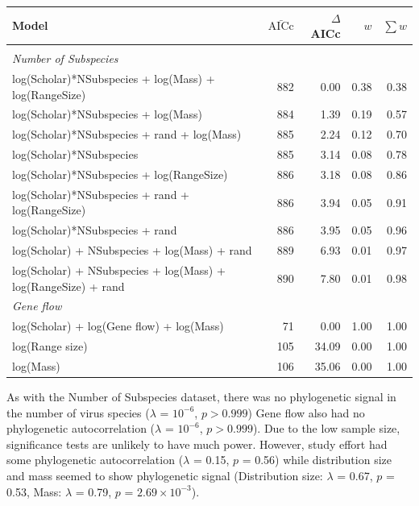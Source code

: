 \begin{table}[t]
\begin{tabular}{@{}>{\footnotesize}p{8cm}rrrr@{}}
\toprule
\normalsize{Model} & $\bar{\text{AICc}}$ & $\Delta$AICc & $w$ & $\sum w$\\
\midrule
&&&&\\[-3mm]
\textit{\small{Number of Subspecies}} &&&&\\
log(Scholar)*NSubspecies  + log(Mass) + log(RangeSize) & 
882 & 0.00 &
0.38 & 0.38\\
log(Scholar)*NSubspecies  + log(Mass) & 
884 & 1.39 &
0.19 & 0.57\\
log(Scholar)*NSubspecies + rand + log(Mass) & 
885 & 2.24 &
0.12 & 0.70\\
log(Scholar)*NSubspecies  & 
885 & 3.14 &
0.08 & 0.78\\
log(Scholar)*NSubspecies  + log(RangeSize) & 
886 & 3.18 &
0.08 & 0.86\\
log(Scholar)*NSubspecies  + rand + log(RangeSize) & 
886 & 3.94 &
0.05 & 0.91\\
log(Scholar)*NSubspecies  + rand & 
886 & 3.95 &
0.05 & 0.96\\
log(Scholar) + NSubspecies + log(Mass) + rand & 
889 & 6.93 &
0.01 & 0.97\\
log(Scholar) + NSubspecies + log(Mass) + log(RangeSize) + rand& 
890 & 7.80 &
0.01 & 0.98\\[5mm]
\textit{\small{Gene flow}} &&&&\\
log(Scholar) + log(Gene flow) + log(Mass) & 
71 & 0.00 &
1.00 & 1.00\\
log(Range size) & 
105 & 34.09 &
0.00 & 1.00\\
log(Mass) & 
106 & 35.06 &
0.00 & 1.00\\
\bottomrule
\end{tabular}

\label{t:models}
\end{table}

As with the Number of Subspecies dataset, there was no phylogenetic signal in the number of virus species ($\lambda$ = \ensuremath{10^{-6}}, $p > 0.999$)
Gene flow also had no phylogenetic autocorrelation ($\lambda$ = \ensuremath{10^{-6}},  $p > 0.999$).
Due to the low sample size, significance tests are unlikely to have much power.
However, study effort had some phylogenetic autocorrelation ($\lambda$ = 0.15, $p$ = 0.56) while distribution size and mass seemed to show phylogenetic signal (Distribution size: $\lambda$ = 0.67, $p$ = 0.53, Mass: $\lambda$ = 0.79, $p$ = \ensuremath{2.69\times 10^{-3}}).


